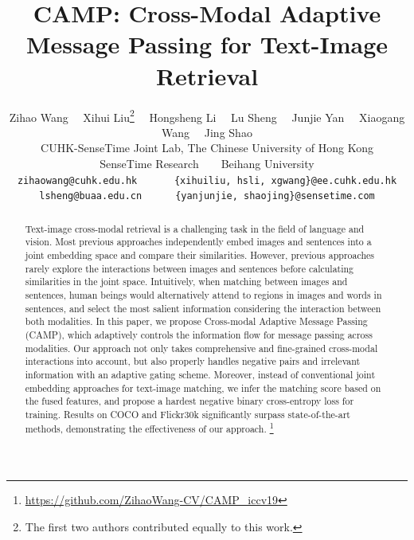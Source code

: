 \documentclass[10pt,twocolumn,letterpaper]{article}
\begin{document}
\title{CAMP: Cross-Modal Adaptive Message Passing for Text-Image Retrieval}

\author{Zihao Wang~~
Xihui Liu\thanks{The first two authors contributed equally to this work.}~~
Hongsheng Li~~
Lu Sheng~~
Junjie Yan~~
Xiaogang Wang~~
Jing Shao
\\
CUHK-SenseTime Joint Lab, The Chinese University of Hong Kong\\
SenseTime Research~~~~Beihang University\\
{\tt\small zihaowang@cuhk.edu.hk}~~~~~~
{\tt\small\{xihuiliu, hsli, xgwang\}@ee.cuhk.edu.hk}\\
{\tt\small lsheng@buaa.edu.cn}~~~~~~{\tt\small \{yanjunjie, shaojing\}@sensetime.com}
}

\maketitle
\ificcvfinal\thispagestyle{empty}\fi



\begin{abstract}
Text-image cross-modal retrieval is a challenging task in the field of language and vision. Most previous approaches independently embed images and sentences into a joint embedding space and compare their similarities. However, previous approaches rarely explore the interactions between images and sentences before calculating similarities in the joint space. Intuitively, when matching between images and sentences, human beings would alternatively attend to regions in images and words in sentences, and select the most salient information considering the interaction between both modalities. In this paper, we propose Cross-modal Adaptive Message Passing (CAMP), which adaptively controls the information flow for message passing across modalities. Our approach not only takes comprehensive and fine-grained cross-modal interactions into account, but also properly handles negative pairs and irrelevant information with an adaptive gating scheme. Moreover, instead of conventional joint embedding approaches for text-image matching, we infer the matching score based on the fused features, and propose a hardest negative binary cross-entropy loss for training. Results on COCO and Flickr30k significantly surpass state-of-the-art methods, demonstrating the effectiveness of our approach. \footnote{\url{https://github.com/ZihaoWang-CV/CAMP_iccv19}} 
\end{abstract}

\vspace{-10pt}
\end{document}
